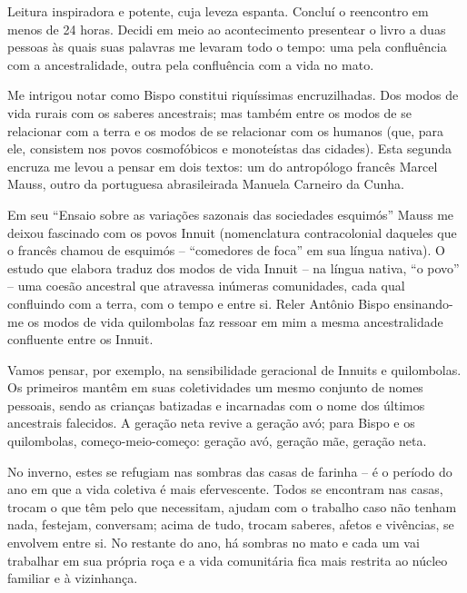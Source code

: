 Leitura inspiradora e potente, cuja leveza espanta. Concluí o reencontro em  menos de 24 horas. Decidi em meio ao acontecimento presentear o livro a duas pessoas às quais suas palavras me levaram todo o tempo: uma pela confluência com a ancestralidade, outra pela confluência com a vida no mato.

Me intrigou notar como Bispo constitui riquíssimas encruzilhadas. Dos modos de vida rurais com os saberes ancestrais; mas também entre os modos de se relacionar com a terra e os modos de se relacionar com os humanos (que, para ele, consistem nos povos cosmofóbicos e monoteístas das cidades).  Esta segunda encruza me levou a pensar em dois textos: um do antropólogo francês Marcel Mauss, outro da portuguesa abrasileirada Manuela Carneiro da Cunha.

Em seu \enquote{Ensaio sobre as variações sazonais das sociedades esquimós} Mauss  me deixou fascinado com os povos Innuit (nomenclatura contracolonial daqueles que o francês  chamou de esquimós --  \enquote{comedores de foca} em sua língua nativa). O  estudo que elabora traduz dos modos de vida  Innuit -- na língua nativa, \enquote{o povo} -- uma coesão ancestral que atravessa inúmeras comunidades, cada qual confluindo com a terra, com o tempo e entre si. Reler Antônio Bispo ensinando-me os modos de vida quilombolas faz ressoar em mim a mesma ancestralidade confluente entre os Innuit.

Vamos pensar, por exemplo, na sensibilidade geracional de Innuits e quilombolas. Os primeiros mantêm  em suas coletividades  um mesmo conjunto de nomes pessoais, sendo as  crianças batizadas e incarnadas com o nome dos últimos ancestrais  falecidos. A geração neta revive a geração avó; para Bispo e os quilombolas, começo-meio-começo: geração avó, geração mãe, geração neta.

No inverno, estes se refugiam nas sombras das casas de farinha -- é o período do ano em que a vida coletiva é mais efervescente. Todos se encontram nas casas, trocam o que têm pelo que necessitam, ajudam com o trabalho caso não tenham nada, festejam, conversam; acima de tudo, trocam saberes, afetos e vivências, se envolvem entre si. No restante do ano, há sombras no mato e cada um vai trabalhar em sua própria roça  e a vida comunitária fica mais restrita ao núcleo familiar e à vizinhança.

